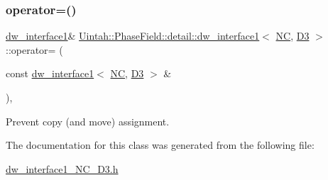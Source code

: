 \subsubsection{\texorpdfstring{operator=()}{operator=()}}
{\footnotesize\ttfamily \hyperlink{classUintah_1_1PhaseField_1_1detail_1_1dw__interface1}{dw\+\_\+interface1}\& \hyperlink{classUintah_1_1PhaseField_1_1detail_1_1dw__interface1}{Uintah\+::\+Phase\+Field\+::detail\+::dw\+\_\+interface1}$<$ \hyperlink{namespaceUintah_1_1PhaseField_a33d355affda78a83f45755ba8388cedda77924170fe82bfd58b74ca3e44139718}{NC}, \hyperlink{namespaceUintah_1_1PhaseField_a12bfc68444894dffdf0cb8d9cf0cc76aa72fd61934c7ca788c49ad90629f76e78}{D3} $>$\+::operator= (\begin{DoxyParamCaption}\item[{const \hyperlink{classUintah_1_1PhaseField_1_1detail_1_1dw__interface1}{dw\+\_\+interface1}$<$ \hyperlink{namespaceUintah_1_1PhaseField_a33d355affda78a83f45755ba8388cedda77924170fe82bfd58b74ca3e44139718}{NC}, \hyperlink{namespaceUintah_1_1PhaseField_a12bfc68444894dffdf0cb8d9cf0cc76aa72fd61934c7ca788c49ad90629f76e78}{D3} $>$ \&}]{ }\end{DoxyParamCaption})\hspace{0.3cm}{\ttfamily [protected]}, {\ttfamily [delete]}}



Prevent copy (and move) assignment. 



The documentation for this class was generated from the following file\+:\begin{DoxyCompactItemize}
\item 
\hyperlink{dw__interface1__NC__D3_8h}{dw\+\_\+interface1\+\_\+\+N\+C\+\_\+\+D3.\+h}\end{DoxyCompactItemize}
